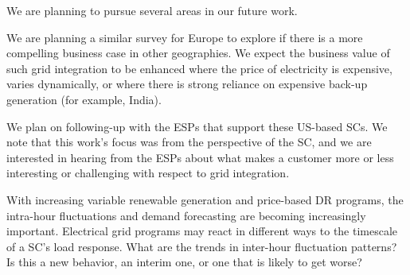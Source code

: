 We are planning to pursue several areas in our future work.

We are planning a similar survey for Europe to explore if there is a more compelling business case 
in other geographies.
We expect the business value of such grid integration to be enhanced where the price of 
electricity is expensive, varies dynamically, or where there is strong reliance on expensive back-up 
generation (for example, India).  

We plan on following-up with the ESPs that support these US-based SCs. We note that this work's focus was from the perspective of the SC, and 
we are interested in hearing from the ESPs about what makes a customer more or less interesting or 
challenging with respect to grid integration.

With increasing variable renewable generation and price-based DR programs, the intra-hour fluctuations 
and demand forecasting are becoming increasingly important.
Electrical grid programs may react in different ways to the timescale of a SC's load response.
What are the trends 
in inter-hour fluctuation patterns? Is this a new behavior, an interim one, or one that is likely to get worse?
